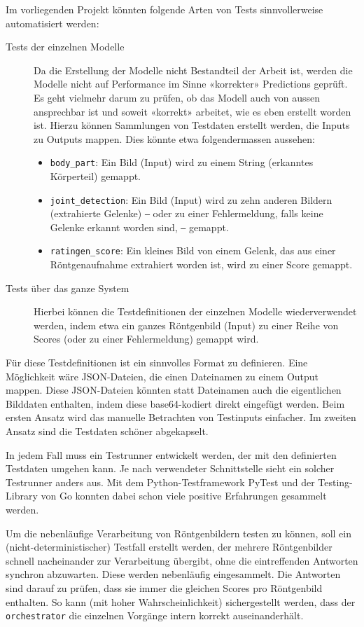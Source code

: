Im vorliegenden Projekt könnten folgende Arten von Tests sinnvollerweise automatisiert werden:

\begin{description}
    \item[Tests der einzelnen Modelle] Da die Erstellung der Modelle nicht Bestandteil der Arbeit ist, werden die Modelle nicht auf Performance im Sinne «korrekter» Predictions geprüft. Es geht vielmehr darum zu prüfen, ob das Modell auch von aussen ansprechbar ist und soweit «korrekt» arbeitet, wie es eben erstellt worden ist. Hierzu können Sammlungen von Testdaten erstellt werden, die Inputs zu Outputs mappen. Dies könnte etwa folgendermassen aussehen:
        \begin{itemize}
            \item \texttt{body\_part}: Ein Bild (Input) wird zu einem String (erkanntes Körperteil) gemappt.
            \item \texttt{joint\_detection}: Ein Bild (Input) wird zu zehn anderen Bildern (extrahierte Gelenke) ‒ oder zu einer Fehlermeldung, falls keine Gelenke erkannt worden sind, ‒ gemappt.
            \item \texttt{ratingen\_score}: Ein kleines Bild von einem Gelenk, das aus einer Röntgenaufnahme extrahiert worden ist, wird zu einer Score gemappt.
        \end{itemize}
    \item[Tests über das ganze System] Hierbei können die Testdefinitionen der einzelnen Modelle wiederverwendet werden, indem etwa ein ganzes Röntgenbild (Input) zu einer Reihe von Scores (oder zu einer Fehlermeldung) gemappt wird.
\end{description}

Für diese Testdefinitionen ist ein sinnvolles Format zu definieren. Eine Möglichkeit wäre JSON-Dateien, die einen Dateinamen zu einem Output mappen. Diese JSON-Dateien könnten statt Dateinamen auch die eigentlichen Bilddaten enthalten, indem diese base64-kodiert direkt eingefügt werden. Beim ersten Ansatz wird das manuelle Betrachten von Testinputs einfacher. Im zweiten Ansatz sind die Testdaten schöner abgekapselt.

In jedem Fall muss ein Testrunner entwickelt werden, der mit den definierten Testdaten umgehen kann. Je nach verwendeter Schnittstelle sieht ein solcher Testrunner anders aus. Mit dem Python-Testframework PyTest und der Testing-Library von Go konnten dabei schon viele positive Erfahrungen gesammelt werden.

Um die nebenläufige Verarbeitung von Röntgenbildern testen zu können, soll ein (nicht-deterministischer) Testfall erstellt werden, der mehrere Röntgenbilder schnell nacheinander zur Verarbeitung übergibt, ohne die eintreffenden Antworten synchron abzuwarten. Diese werden nebenläufig eingesammelt. Die Antworten sind darauf zu prüfen, dass sie immer die gleichen Scores pro Röntgenbild enthalten. So kann (mit hoher Wahrscheinlichkeit) sichergestellt werden, dass der \texttt{orchestrator} die einzelnen Vorgänge intern korrekt auseinanderhält.

